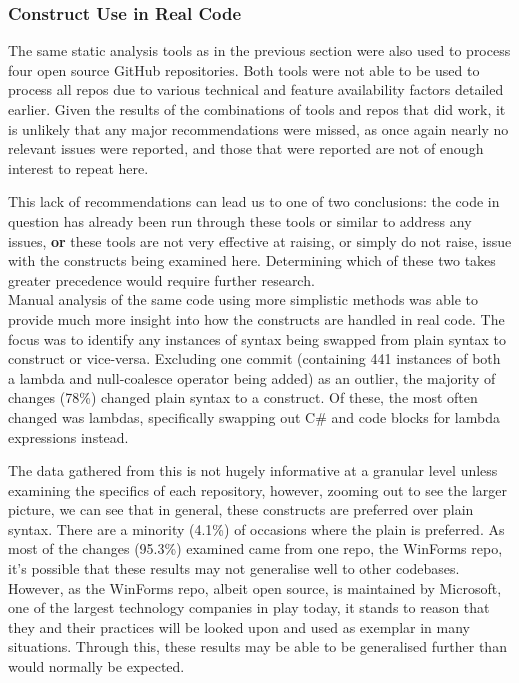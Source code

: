 \documentclass{article}
\begin{document}
        \subsubsection{Construct Use in Real Code}
            The same static analysis tools as in the previous section were also used to process four open source GitHub repositories. Both tools were not able to be used to process all repos due to various technical and feature availability factors detailed earlier. Given the results of the combinations of tools and repos that did work, it is unlikely that any major recommendations were missed, as once again nearly no relevant issues were reported, and those that were reported are not of enough interest to repeat here.
            
            This lack of recommendations can lead us to one of two conclusions: the code in question has already been run through these tools or similar to address any issues, \textbf{or} these tools are not very effective at raising, or simply do not raise, issue with the constructs being examined here. Determining which of these two takes greater precedence would require further research.
            \\

            Manual analysis of the same code using more simplistic methods was able to provide much more insight into how the constructs are handled in real code. The focus was to identify any instances of syntax being swapped from plain syntax to construct or vice-versa. Excluding one commit (containing 441 instances of both a lambda and null-coalesce operator being added) as an outlier, the majority of changes (78\%) changed plain syntax to a construct. Of these, the most often changed was lambdas, specifically swapping out C\#  and  code blocks for lambda expressions instead.

            The data gathered from this is not hugely informative at a granular level unless examining the specifics of each repository, however, zooming out to see the larger picture, we can see that in general, these constructs are preferred over plain syntax. There are a minority (4.1\%) of occasions where the plain is preferred. As most of the changes (95.3\%) examined came from one repo, the WinForms repo, it's possible that these results may not generalise well to other codebases. However, as the WinForms repo, albeit open source, is maintained by Microsoft, one of the largest technology companies in play today, it stands to reason that they and their practices will be looked upon and used as exemplar in many situations. Through this, these results may be able to be generalised further than would normally be expected.
\end{document}
